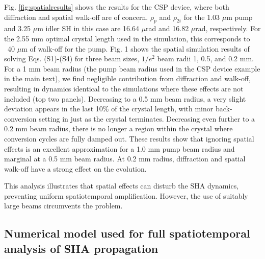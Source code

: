 \documentclass[%
 reprint,
 amsmath,amssymb,
 aps,
floatfix,
]{revtex4-2}
\begin{document}
Fig. \ref{fig:spatialresults} shows the results for the CSP device, where both diffraction and spatial walk-off are of concern. $\rho_p$ and $\rho_{2i}$ for the 1.03 $\mu$m pump and 3.25 $\mu$m idler SH in this case are 16.64 $\mu$rad and 16.82 $\mu$rad, respectively. For the 2.55 mm optimal crystal length used in the simulation, this corresponds to ~40 $\mu$m of walk-off for the pump. Fig. 1 shows the spatial simulation results of solving Eqs. (S1)-(S4) for three beam sizes, $1/e^2$ beam radii 1, 0.5, and 0.2 mm. For a 1 mm beam radius (the pump beam radius used in the CSP device example in the main text), we find negligible contribution from diffraction and walk-off, resulting in dynamics identical to the simulations where these effects are not included (top two panels). Decreasing to a 0.5 mm beam radius, a very slight deviation appears in the last 10\% of the crystal length, with minor back-conversion setting in just as the crystal terminates. Decreasing even further to a 0.2 mm beam radius, there is no longer a region within the crystal where conversion cycles are fully damped out. These results show that ignoring spatial effects is an excellent approximation for a 1.0 mm pump beam radius and marginal at a 0.5 mm beam radius. At 0.2 mm radius, diffraction and spatial walk-off have a strong effect on the evolution.

This analysis illustrates that spatial effects can disturb the SHA dynamics, preventing uniform spatiotemporal amplification. However, the use of suitably large beams circumvents the problem.

\subsection{Numerical model used for full spatiotemporal analysis of SHA propagation}
\end{document}
